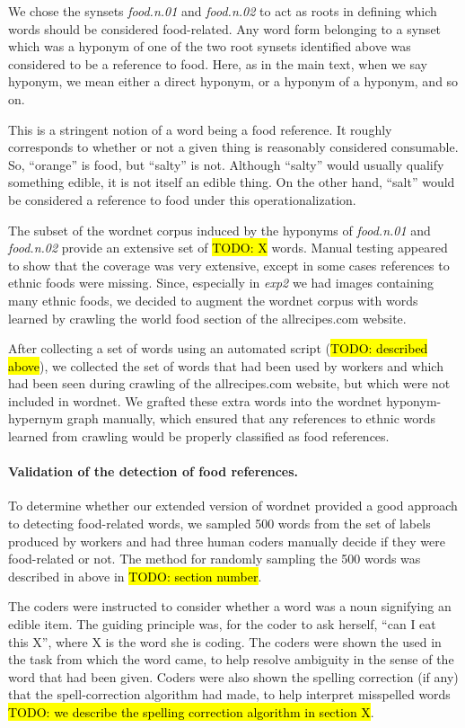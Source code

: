 \documentclass[12pt]{article}
\newcommand{\td}[1]{{\color{blu}\hl{TODO: #1}}}
\begin{document}
We chose the synsets \textit{food.n.01} and \textit{food.n.02} to act as roots
in defining which words should be considered food-related.  Any word form
belonging to a synset which was a hyponym of one of the two root synsets
identified above was considered to be a reference to food.  Here, as in the
main text, when we say hyponym, we mean either a direct hyponym, or a hyponym
of a hyponym, and so on.

This is a stringent notion of a word being a food reference.  It roughly
corresponds to whether or not a given thing is reasonably considered 
consumable.  So, ``orange'' is food, but ``salty'' is not.  Although ``salty''
would usually qualify something edible, it is not itself an edible thing.
On the other hand, ``salt'' would be considered a reference to food under 
this operationalization.

The subset of the wordnet corpus induced by the hyponyms of \textit{food.n.01}
and \textit{food.n.02} provide an extensive set of \td{X} words.  Manual
testing appeared to show that the coverage was very extensive, except in 
some cases references to ethnic foods were missing.  Since, especially in
\textit{exp2} we had images containing many ethnic foods, we decided to 
augment the wordnet corpus with words learned by crawling the world food
section of the allrecipes.com website.  

After collecting a set of words using an automated script 
(\td{described above}), we collected the set of words that had been used by
workers and which had been seen during crawling of the allrecipes.com website,
but which were not included in wordnet.  We grafted these extra words into
the wordnet hyponym-hypernym graph manually, which ensured that any references
to ethnic words learned from crawling would be properly classified as 
food references.

\paragraph{Validation of the detection of food references.}
To determine whether our extended version of wordnet provided a good approach
to detecting food-related words, we sampled 500 words from the set of labels
produced by workers and had three human coders manually decide if they were 
food-related or not.  The method for randomly sampling the 500 words was 
described in above in \td{section number}.

The coders were instructed to consider whether a word was a noun signifying
an edible item.  The guiding principle was, for the coder to ask herself,
``can I eat this X'', where X is the word she is coding.  The coders were
shown the used in the task from which the word came, to help resolve ambiguity
in the sense of the word that had been given.  Coders were also shown the 
spelling correction (if any) that the spell-correction algorithm had made,
to help interpret misspelled words \td{we describe the spelling correction 
algorithm in section X}.
\end{document}
